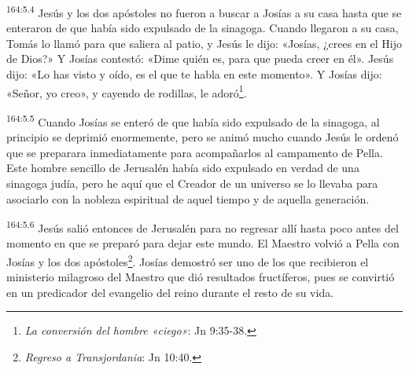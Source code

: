 \par 
\textsuperscript{164:5.4} Jesús y los dos apóstoles no fueron a buscar a Josías a su casa hasta que se enteraron de que había sido expulsado de la sinagoga. Cuando llegaron a su casa, Tomás lo llamó para que saliera al patio, y Jesús le dijo: «Josías, ¿crees en el Hijo de Dios?» Y Josías contestó: «Dime quién es, para que pueda creer en él». Jesús dijo: «Lo has visto y oído, es el que te habla en este momento». Y Josías dijo: «Señor, yo creo», y cayendo de rodillas, le adoró\footnote{\textit{La conversión del hombre «ciego»}: Jn 9:35-38.}.

\par 
\textsuperscript{164:5.5} Cuando Josías se enteró de que había sido expulsado de la sinagoga, al principio se deprimió enormemente, pero se animó mucho cuando Jesús le ordenó que se preparara inmediatamente para acompañarlos al campamento de Pella. Este hombre sencillo de Jerusalén había sido expulsado en verdad de una sinagoga judía, pero he aquí que el Creador de un universo se lo llevaba para asociarlo con la nobleza espiritual de aquel tiempo y de aquella generación.

\par 
\textsuperscript{164:5.6} Jesús salió entonces de Jerusalén para no regresar allí hasta poco antes del momento en que se preparó para dejar este mundo. El Maestro volvió a Pella con Josías y los dos apóstoles\footnote{\textit{Regreso a Transjordania}: Jn 10:40.}. Josías demostró ser uno de los que recibieron el ministerio milagroso del Maestro que dió resultados fructíferos, pues se convirtió en un predicador del evangelio del reino durante el resto de su vida.